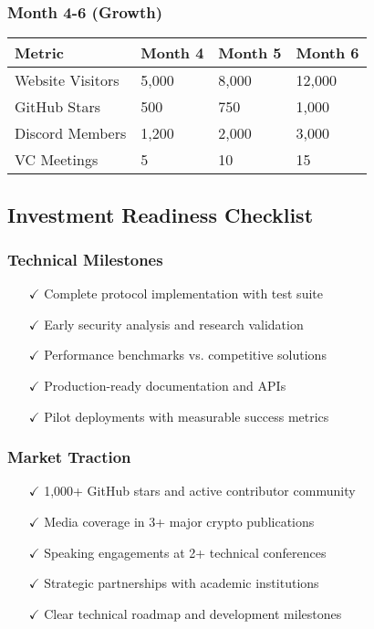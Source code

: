 \documentclass[12pt,a4paper]{article}
\begin{document}
\begin{itemize}
\subsubsection{Month 4-6 (Growth)}
\begin{center}
\begin{tabular}{|l|l|l|l|}
\hline
\textbf{Metric} & \textbf{Month 4} & \textbf{Month 5} & \textbf{Month 6} \\
\hline
Website Visitors & 5,000 & 8,000 & 12,000 \\
\hline
GitHub Stars & 500 & 750 & 1,000 \\
\hline
Discord Members & 1,200 & 2,000 & 3,000 \\
\hline
VC Meetings & 5 & 10 & 15 \\
\hline
\end{tabular}
\end{center}

\subsection{Investment Readiness Checklist}

\subsubsection{Technical Milestones}
\begin{itemize}
    \item[\(\checkmark\)] Complete protocol implementation with test suite
    \item[\(\checkmark\)] Early security analysis and research validation
    \item[\(\checkmark\)] Performance benchmarks vs. competitive solutions
    \item[\(\checkmark\)] Production-ready documentation and APIs
    \item[\(\checkmark\)] Pilot deployments with measurable success metrics
\end{itemize}

\subsubsection{Market Traction}
\begin{itemize}
    \item[\(\checkmark\)] 1,000+ GitHub stars and active contributor community
    \item[\(\checkmark\)] Media coverage in 3+ major crypto publications
    \item[\(\checkmark\)] Speaking engagements at 2+ technical conferences
    \item[\(\checkmark\)] Strategic partnerships with academic institutions
    \item[\(\checkmark\)] Clear technical roadmap and development milestones
\end{itemize}


\end{itemize}
\end{document}
